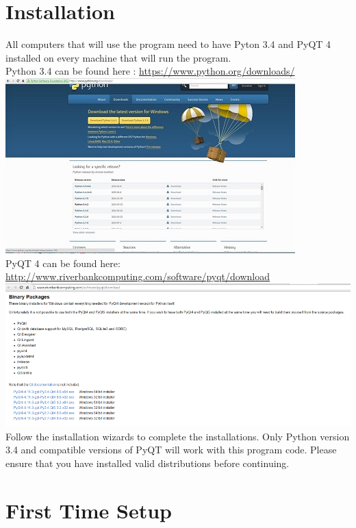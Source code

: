 \documentclass{report}
\begin{document}
\chapter{Installation}
 All computers that will use the program need to have Pyton 3.4 and PyQT 4 installed on every machine that will run the program.\\
 Python 3.4 can be found here : \hyperref[Python Downloads]{https://www.python.org/downloads/}\\
\includegraphics{PythonDownload}\\
 \clearpage
 PyQT 4 can be found here: \hyperref[PyQT]{http://www.riverbankcomputing.com/software/pyqt/download}\\
 \includegraphics{PyQTDownload}\\
Follow the installation wizards to complete the installations.
Only Python version 3.4 and compatible versions of PyQT will work with this program code. Please ensure that you have installed valid distributions before continuing.\\
 
 
\chapter{First Time Setup}
\end{document}
